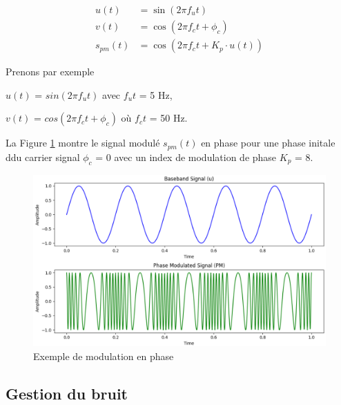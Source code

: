 \begin{align}
    u(t) &= \sin(2\pi f_{u}t) \\
    v(t) &= \cos(2\pi f_{c}t + \phi_{c}) \\
    s_{pm}(t) &= \cos\left(2\pi f_{c}t + K_{p} \cdot u(t)\right)
\end{align}

\vspace{0.1cm}

Prenons par exemple

\vspace{0.1cm}

$u(t)$ = $sin(2\pi f_{u}t)$ avec $f_{u}t$ = 5 Hz,

$v(t)$ = $cos(2\pi f_{c}t + \phi_{c})$ où $f_{c}t$ = 50 Hz.

\vspace{0.1cm}

La Figure \ref{term3} montre le signal modulé $s_{pm}(t)$ en phase pour une phase initale ddu carrier signal $\phi_{c}$ = 0 avec un index de modulation de phase $K_{p}$ = 8.

\newpage

\begin{figure}[h]
\centering

\includegraphics[scale=0.5]{images/PM_mod.PNG}
\caption{Exemple de modulation en phase}\label{term3}
\end{figure}

\subsection{Gestion du bruit}


